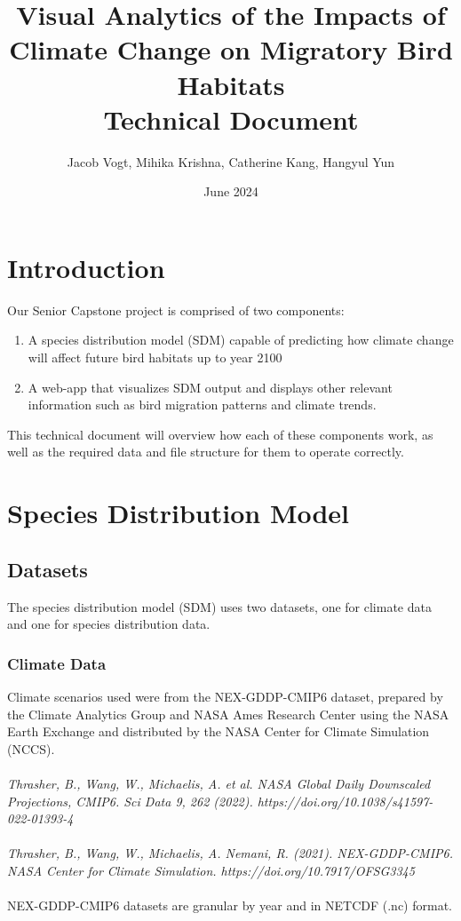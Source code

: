 \documentclass{article}
\title{Visual Analytics of the Impacts of Climate Change on 
Migratory Bird Habitats \\
 \Large{Technical Document}}
\author{Jacob Vogt, Mihika Krishna, Catherine Kang, Hangyul Yun}
\affil{Professor Dongyu Liu}
\affil{University of California, Davis}
\date{June 2024}
\begin{document}
\maketitle

\tableofcontents

\newpage

\section{Introduction}
Our Senior Capstone project is comprised of two components:

\begin{enumerate}
  \item A species distribution model (SDM) capable of predicting how climate change will affect future bird habitats up to year 2100
  \item A web-app that visualizes SDM output and displays other relevant information such as bird migration patterns and climate trends.
\end{enumerate}

This technical document will overview how each of these components work, as well as the required data and file structure for them to operate correctly.

\section{Species Distribution Model}

\subsection{Datasets}

The species distribution model (SDM) uses two datasets, one for climate data and one for species distribution data.

\subsubsection*{Climate Data}

Climate scenarios used were from the NEX-GDDP-CMIP6 dataset, prepared by the
Climate Analytics Group and NASA Ames Research Center using the NASA Earth
Exchange and distributed by the NASA Center for Climate Simulation (NCCS).
\\\\
\textit{
Thrasher, B., Wang, W., Michaelis, A. et al. NASA Global Daily Downscaled
Projections, CMIP6. Sci Data 9, 262 (2022). https://doi.org/10.1038/s41597-022-01393-4
\\\\
Thrasher, B., Wang, W., Michaelis, A. Nemani, R. (2021). NEX-GDDP-CMIP6. NASA
Center for Climate Simulation. https://doi.org/10.7917/OFSG3345}
\\\\
NEX-GDDP-CMIP6 datasets are granular by year and in NETCDF (.nc) format.
\end{document}
